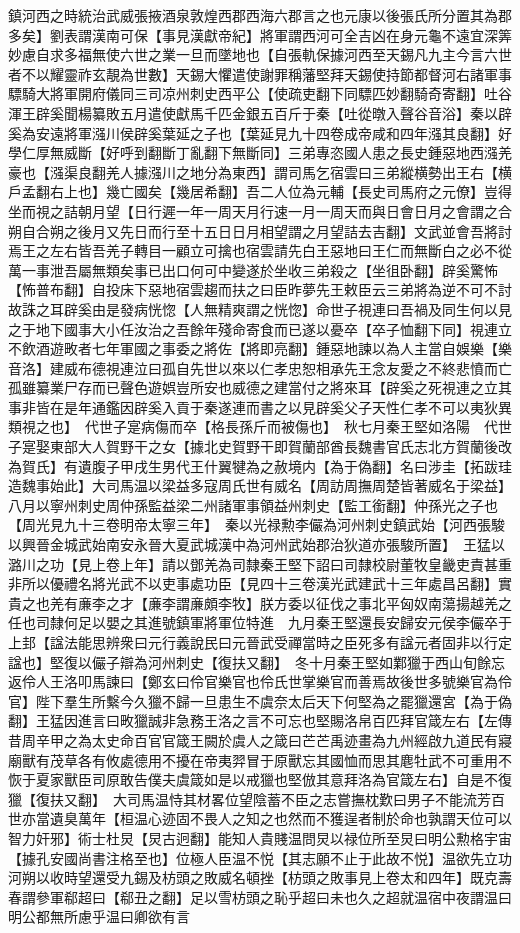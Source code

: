鎮河西之時統治武威張掖酒泉敦煌西郡西海六郡言之也元康以後張氏所分置其為郡多矣】劉表謂漢南可保【事見漢獻帝紀】將軍謂西河可全吉凶在身元龜不遠宜深筭妙慮自求多福無使六世之業一旦而墜地也【自張軌保據河西至天錫凡九主今言六世者不以耀靈祚玄靚為世數】天錫大懼遣使謝罪稱藩堅拜天錫使持節都督河右諸軍事驃騎大將軍開府儀同三司凉州刺史西平公【使疏吏翻下同驃匹妙翻騎奇寄翻】吐谷渾王辟奚聞楊纂敗五月遣使獻馬千匹金銀五百斤于秦【吐從暾入聲谷音浴】秦以辟奚為安遠將軍漒川侯辟奚葉延之子也【葉延見九十四卷成帝咸和四年漒其良翻】好學仁厚無威斷【好呼到翻斷丁亂翻下無斷同】三弟專恣國人患之長史鍾惡地西漒羌豪也【漒渠良翻羌人據漒川之地分為東西】謂司馬乞宿雲曰三弟縱横勢出王右【横戶孟翻右上也】幾亡國矣【幾居希翻】吾二人位為元輔【長史司馬府之元僚】豈得坐而視之詰朝月望【日行遲一年一周天月行速一月一周天而與日會日月之會謂之合朔自合朔之後月又先日而行至十五日日月相望謂之月望詰去吉翻】文武並會吾將討焉王之左右皆吾羌子轉目一顧立可擒也宿雲請先白王惡地曰王仁而無斷白之必不從萬一事泄吾屬無類矣事已出口何可中變遂於坐收三弟殺之【坐徂卧翻】辟奚驚怖【怖普布翻】自投床下惡地宿雲趨而扶之曰臣昨夢先王敕臣云三弟將為逆不可不討故誅之耳辟奚由是發病恍惚【人無精爽謂之恍惚】命世子視連曰吾禍及同生何以見之于地下國事大小任汝治之吾餘年殘命寄食而已遂以憂卒【卒子恤翻下同】視連立不飲酒遊畋者七年軍國之事委之將佐【將即亮翻】鍾惡地諫以為人主當自娛樂【樂音洛】建威布德視連泣曰孤自先世以來以仁孝忠恕相承先王念友愛之不終悲憤而亡孤雖纂業尸存而已聲色遊娯豈所安也威德之建當付之將來耳【辟奚之死視連之立其事非皆在是年通鑑因辟奚入貢于秦遂連而書之以見辟奚父子天性仁孝不可以夷狄異類視之也】　代世子寔病傷而卒【格長孫斤而被傷也】　秋七月秦王堅如洛陽　代世子寔娶東部大人賀野干之女【據北史賀野干即賀蘭部酋長魏書官氏志北方賀蘭後改為賀氏】有遺腹子甲戌生男代王什翼犍為之赦境内【為于偽翻】名曰涉圭【拓跋珪造魏事始此】大司馬温以梁益多寇周氏世有威名【周訪周撫周楚皆著威名于梁益】八月以寧州刺史周仲孫監益梁二州諸軍事領益州刺史【監工銜翻】仲孫光之子也【周光見九十三卷明帝太寧三年】　秦以光禄勲李儼為河州刺史鎮武始【河西張駿以興晉金城武始南安永晉大夏武城漢中為河州武始郡治狄道亦張駿所置】　王猛以潞川之功【見上卷上年】請以鄧羌為司隸秦王堅下詔曰司隸校尉董牧皇畿吏責甚重非所以優禮名將光武不以吏事處功臣【見四十三卷漢光武建武十三年處昌呂翻】實貴之也羌有亷李之才【亷李謂亷頗李牧】朕方委以征伐之事北平匈奴南蕩揚越羌之任也司隸何足以嬰之其進號鎮軍將軍位特進　九月秦王堅還長安歸安元侯李儼卒于上邽【諡法能思辨衆曰元行義說民曰元晉武受禪當時之臣死多有諡元者固非以行定諡也】堅復以儼子辯為河州刺史【復扶又翻】　冬十月秦王堅如鄴獵于西山旬餘忘返伶人王洛叩馬諫曰【鄭玄曰伶官樂官也伶氏世掌樂官而善焉故後世多號樂官為伶官】陛下羣生所繫今久獵不歸一旦患生不虞奈太后天下何堅為之罷獵還宮【為于偽翻】王猛因進言曰畋獵誠非急務王洛之言不可忘也堅賜洛帛百匹拜官箴左右【左傳昔周辛甲之為太史命百官官箴王闕於虞人之箴曰芒芒禹迹畫為九州經啟九道民有寢廟獸有茂草各有攸處德用不擾在帝夷羿冒于原獸忘其國恤而思其麀牡武不可重用不恢于夏家獸臣司原敢告僕夫虞箴如是以戒獵也堅倣其意拜洛為官箴左右】自是不復獵【復扶又翻】　大司馬温恃其材畧位望陰蓄不臣之志嘗撫枕歎曰男子不能流芳百世亦當遺臭萬年【桓温心迹固不畏人之知之也然而不獲逞者制於命也孰謂天位可以智力奸邪】術士杜炅【炅古迥翻】能知人貴賤温問炅以禄位所至炅曰明公勲格宇宙【據孔安國尚書注格至也】位極人臣温不悦【其志願不止于此故不悦】温欲先立功河朔以收時望還受九錫及枋頭之敗威名頓挫【枋頭之敗事見上卷太和四年】既克壽春謂參軍郗超曰【郗丑之翻】足以雪枋頭之恥乎超曰未也久之超就温宿中夜謂温曰明公都無所慮乎温曰卿欲有言